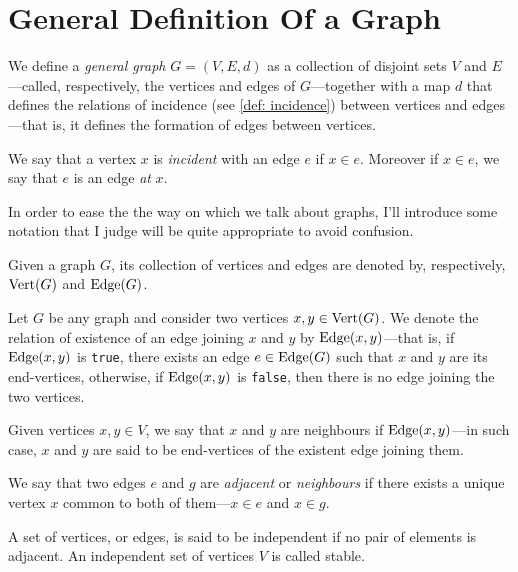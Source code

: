 \section{General Definition Of a Graph}

\begin{definition}\label{def: general-graph}
    We define a \emph{general graph} \(G = (V, E, d)\) as a collection of disjoint
    sets \(V\) and \(E\)---called, respectively, the vertices and edges of
    \(G\)---together with a map \(d\) that defines the relations of incidence (see
    \cref{def: incidence}) between vertices and edges---that is, it defines the
    formation of edges between vertices.
\end{definition}

\begin{definition}[Incidence]\label{def: incidence}
    We say that a vertex \(x\) is \emph{incident} with an edge \(e\) if \(x \in
    e\). Moreover if \(x \in e\), we say that \(e\) is an edge \emph{at} \(x\).
\end{definition}

In order to ease the the way on which we talk about graphs, I'll introduce some
notation that I judge will be quite appropriate to avoid confusion.

\begin{notation}
    Given a graph \(G\), its collection of vertices and edges are denoted by,
    respectively, \(\operatorname{Vert}(G)\) and \(\operatorname{Edge}(G)\).
\end{notation}

\begin{notation}
    Let \(G\) be any graph and consider two vertices \(x, y \in \operatorname{Vert}(G)\). We
    denote the relation of existence of an edge joining \(x\) and \(y\) by
    \(\operatorname{Edge}(x, y)\)---that is, if \(\operatorname{Edge}(x, y)\) is \texttt{true}, there exists
    an edge \(e \in \operatorname{Edge}(G)\) such that \(x\) and \(y\) are its end-vertices,
    otherwise, if \(\operatorname{Edge}(x, y)\) is \texttt{false}, then there is no edge joining
    the two vertices.
\end{notation}

\begin{definition}[Adjacency]
    Given vertices \(x, y \in V\), we say that \(x\) and \(y\) are neighbours if
    \(\operatorname{Edge}(x, y)\)---in such case, \(x\) and \(y\) are said to be end-vertices of
    the existent edge joining them.

    We say that two edges \(e\) and \(g\) are \emph{adjacent} or \emph{neighbours}
    if there exists a unique vertex \(x\) common to both of them---\(x \in e\)
    and \(x \in g\).

    A set of vertices, or edges, is said to be independent if no pair of elements
    is adjacent. An independent set of vertices \(V\) is called stable.
\end{definition}

